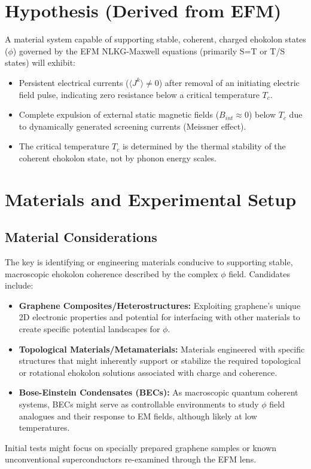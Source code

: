 \documentclass[a4paper,12pt]{article}
\begin{document}
\section{Hypothesis (Derived from EFM)}
A material system capable of supporting stable, coherent, charged ehokolon states (\(\phi\)) governed by the EFM NLKG-Maxwell equations (primarily S=T or T/S states) will exhibit:
\begin{itemize}
    \item Persistent electrical currents (\(\langle J^k \rangle \neq 0\)) after removal of an initiating electric field pulse, indicating zero resistance below a critical temperature \(T_c\).
    \item Complete expulsion of external static magnetic fields (\(B_{int} \approx 0\)) below \(T_c\) due to dynamically generated screening currents (Meissner effect).
    \item The critical temperature \(T_c\) is determined by the thermal stability of the coherent ehokolon state, not by phonon energy scales.
\end{itemize}

\section{Materials and Experimental Setup}
\subsection{Material Considerations}
The key is identifying or engineering materials conducive to supporting stable, macroscopic ehokolon coherence described by the complex \(\phi\) field. Candidates include:
\begin{itemize}
    \item \textbf{Graphene Composites/Heterostructures:} Exploiting graphene's unique 2D electronic properties and potential for interfacing with other materials to create specific potential landscapes for \(\phi\).
    \item \textbf{Topological Materials/Metamaterials:} Materials engineered with specific structures that might inherently support or stabilize the required topological or rotational ehokolon solutions associated with charge and coherence.
    \item \textbf{Bose-Einstein Condensates (BECs):} As macroscopic quantum coherent systems, BECs might serve as controllable environments to study \(\phi\) field analogues and their response to EM fields, although likely at low temperatures.
\end{itemize}
Initial tests might focus on specially prepared graphene samples or known unconventional superconductors re-examined through the EFM lens.
\end{document}
